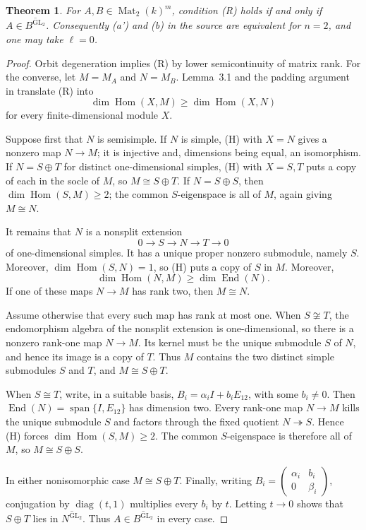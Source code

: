 \documentclass[11pt]{article}
\newtheorem{theorem}{Theorem}
\newcommand{\Mat}{\operatorname{Mat}}
\newcommand{\Hom}{\operatorname{Hom}}
\newcommand{\GL}{\operatorname{GL}}
\begin{document}
\begin{theorem}
For $A,B\in\Mat_2(k)^m$, condition \emph{(R)} holds if and only if
$A\in\overline{B^{\GL_2}}$.  Consequently (a') and (b) in the source are
equivalent for $n=2$, and one may take $\ell=0$.
\end{theorem}

\begin{proof}
Orbit degeneration implies (R) by lower semicontinuity of matrix rank.  For
the converse, let $M=M_A$ and $N=M_B$.  Lemma~3.1 and the padding argument in
\cite{DKMV} translate (R) into
\[
       \dim\Hom(X,M)\geq\dim\Hom(X,N)                 \tag{H}
\]
for every finite-dimensional module $X$.

Suppose first that $N$ is semisimple.  If $N$ is simple, (H) with $X=N$
gives a nonzero map $N\to M$; it is injective and, dimensions being equal, an
isomorphism.  If $N=S\oplus T$ for distinct one-dimensional simples, (H) with
$X=S,T$ puts a copy of each in the socle of $M$, so $M\cong S\oplus T$.  If
$N=S\oplus S$, then $\dim\Hom(S,M)\geq2$; the common $S$-eigenspace is all of
$M$, again giving $M\cong N$.

It remains that $N$ is a nonsplit extension
\[
             0\longrightarrow S\longrightarrow N\longrightarrow T
             \longrightarrow0                                      \tag{E}
\]
of one-dimensional simples.  It has a unique proper nonzero submodule,
namely $S$.  Moreover, $\dim\Hom(S,N)=1$, so (H) puts a copy of $S$ in $M$.
Moreover,
\[
\dim\Hom(N,M)\geq\dim\operatorname{End}(N).
\]
If one of these maps
$N\to M$ has rank two, then $M\cong N$.

Assume otherwise that every such map has rank at most one.  When $S\not\cong
T$, the endomorphism algebra of the nonsplit extension is one-dimensional,
so there is a nonzero rank-one map $N\to M$.  Its kernel must be the unique
submodule $S$ of $N$, and hence its image is a copy of $T$.  Thus $M$ contains
the two distinct simple submodules $S$ and $T$, and $M\cong S\oplus T$.

When $S\cong T$, write, in a suitable basis,
$B_i=\alpha_iI+b_iE_{12}$, with some $b_i\neq0$.  Then
$\operatorname{End}(N)=\operatorname{span}\{I,E_{12}\}$ has dimension two.
Every rank-one map $N\to M$ kills the unique submodule $S$ and factors through
the fixed quotient $N\twoheadrightarrow S$.  Hence (H) forces
$\dim\Hom(S,M)\geq2$.  The common $S$-eigenspace is therefore all of $M$, so
$M\cong S\oplus S$.

In either nonisomorphic case $M\cong S\oplus T$.  Finally, writing
$B_i=\left(\begin{smallmatrix}\alpha_i&b_i\\0&\beta_i\end{smallmatrix}\right)$,
conjugation by $\operatorname{diag}(t,1)$ multiplies every $b_i$ by $t$.
Letting $t\to0$ shows that $S\oplus T$ lies in
$\overline{N^{\GL_2}}$.  Thus $A\in\overline{B^{\GL_2}}$ in every case.
\end{proof}
\end{document}
